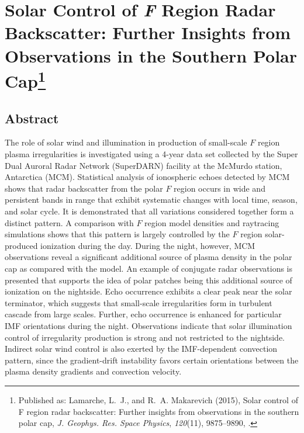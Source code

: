 
\chapter[Solar Control of \textit{F} Region Radar Backscatter: Further Insights from Observations in the Southern Polar Cap]{Solar Control of \textit{F} Region Radar Backscatter: Further Insights from Observations in the Southern Polar Cap\footnote{Published as: {Lamarche}, L.~J., and R.~A. {Makarevich} (2015), Solar control of {F} region radar backscatter: Further insights from observations in the southern polar cap, \textit{J. Geophys. Res. Space Physics}, \textit{120}(11), 9875--9890, .}}

\label{sec:paper1}



\section*{Abstract}
The role of solar wind and illumination in production of small-scale \(F\) region plasma irregularities is investigated using a 4-year data set collected by the Super Dual Auroral Radar Network (SuperDARN) facility at the McMurdo station, Antarctica (MCM). Statistical analysis of ionospheric echoes detected by MCM shows that radar backscatter from the polar \(F\) region occurs in wide and persistent bands in range that exhibit systematic changes with local time, season, and solar cycle. It is demonstrated that all variations considered together form a distinct pattern. A comparison with \(F\) region model densities and raytracing simulations shows that this pattern is largely controlled by the \(F\) region solar-produced ionization during the day. During the night, however, MCM observations reveal a significant additional source of plasma density in the polar cap as compared with the model. An example of conjugate radar observations is presented that supports the idea of polar patches being this additional source of ionization on the nightside. Echo occurrence exhibits a clear peak near the solar terminator, which suggests that small-scale irregularities form in turbulent cascade from large scales. Further, echo occurrence is enhanced for particular IMF orientations during the night. Observations indicate that solar illumination control of irregularity production is strong and not restricted to the nightside. Indirect solar wind control is also exerted by the IMF-dependent convection pattern, since the gradient-drift instability favors certain orientations between the plasma density gradients and convection velocity.


